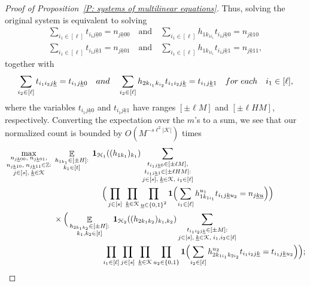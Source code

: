 \documentclass[11pt]{amsart}
\theoremstyle{definition}
\DeclareMathOperator*{\E}{\mathbb{E}}
\newcommand{\Z}{{\mathbb Z}}
\newcommand{\CH}{{\mathcal H}}
\newcommand{\CK}{{\mathcal K}}
\newcommand{\uk}{{\underline{k}}}
\newcommand{\uu}{{\underline{u}}}
\newcommand{\Bigbrac}[1]{\Bigl( #1 \Bigr)}
\begin{document}
\begin{proof}[Proof of Proposition~\ref{P: systems of multilinear equations}]
Thus, solving the original system is equivalent to solving
\begin{align*}
    \sum_{i_1\in[\ell]} t_{i_1 j \uk 0} = n_{j\uk00}\quad \textrm{and}\quad
    \sum_{i_1\in[\ell]} h_{1k_{1i_1}} t_{i_1 j \uk 0} = n_{j\uk10}\\
    \sum_{i_1\in[\ell]} t_{i_1 j \uk 1} = n_{j\uk01} \quad \textrm{and}\quad
    \sum_{i_1\in[\ell]} h_{1k_{1i_1}} t_{i_1 j \uk 1} = n_{j\uk11},
\end{align*}
together with
\begin{align*}
    \sum_{i_2\in[\ell]}t_{i_1 i_2 j\uk} = t_{i_1 j \uk 0} \quad \textrm{and}\quad
    \sum_{i_2\in[\ell]}h_{2k_{i_1}k_{i_2}}t_{i_1 i_2 j\uk} = t_{i_1 j \uk 1}\quad \textrm{for\; each}\quad i_1\in[\ell],
\end{align*}
where the variables $t_{i_1 j \uk 0}$ and $t_{i_1 j \uk 1}$ have ranges $[\pm \ell M]$ and $[\pm\ell H M]$, respectively.  Converting the expectation over the $m$'s to a sum, we see that our normalized count is bounded by $O(M^{-s \ell^2|\CK|})$ times 
        \begin{align*}
        &\max_{\substack{n_{j\uk00},\; n_{j\uk01},\\ n_{j\uk10},\; n_{j\uk11}\in\Z:\\ j\in[s],\; \uk\in\CK}}\;
                \E_{\substack{h_{1k_1}\in[\pm H]:\\  k_1\in[t]}}\; \mathbf{1}_{\CH_1}((h_{1k_1})_{k_1}) \sum_{\substack{t_{i_1 j\uk 0}\in[\pm\ell M],\\ t_{i_1 j\uk 1}\in[\pm \ell H M]:\\ j\in[s],\; \uk\in\CK,\; i_1\in[\ell]}}\\
        &\qquad\qquad\qquad\qquad\qquad\qquad\Big(\prod_{j\in[s]}\; \prod_{\substack{\uk\in\CK}}\prod_{\substack{\uu\in\{0,1\}^2}} \mathbf{1}\Bigbrac{\sum\limits_{i_1\in[\ell]} h_{1k_{1i_1}}^{u_1} t_{i_1 j\uk u_2} = n_{j\uk\uu}}\Big)\\
        &\qquad\qquad\qquad\times \Big(\E_{\substack{h_{2k_1k_2}\in[\pm H]:\\  k_1, k_2\in[t]}}\; \mathbf{1}_{\CH_2}((h_{2k_1k_2})_{k_1, k_2})
        \sum_{\substack{t_{i_1 i_2 j\uk}\in[\pm M]:\\ j\in[s],\; \uk\in\CK,\; i_1, i_2\in[\ell]}}\\
        &\qquad\qquad\qquad\qquad\qquad\qquad\prod_{i_1\in[\ell]}\prod_{j\in[s]}\; \prod_{\substack{\uk\in\CK}}\prod_{\substack{u_2\in\{0,1\}}} \mathbf{1}\Bigbrac{\sum\limits_{i_2\in[\ell]} h_{2k_{1i_1}k_{2i_2}}^{u_2} t_{i_1 i_2 j\uk} = t_{i_1 j\uk u_2}}\Big);

\end{align*}
\end{proof}
\end{document}
